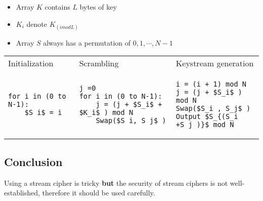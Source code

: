 \begin{itemize}
    \item Array $K$ contains $L$ bytes of key 
    \item $K_i$ denote $K_{(i mod L)}$
    \item Array $S$ always has a permutation of $0, 1, \cdots, N-1$
\end{itemize}
\begin{center}
\begin{tabular}{m{4cm}m{4cm}m{4cm}}
    Initialization & Scrambling & Keystream generation \\
    \begin{lstlisting}[mathescape]
for i in (0 to N-1):
    $S_i$ = i
    \end{lstlisting}
    &
    \begin{lstlisting}[mathescape]
j =0
for i in (0 to N-1):
    j = (j + $S_i$ + $K_i$ ) mod N
    Swap($S_i, S_j$ )
    \end{lstlisting}
    &
    \begin{lstlisting}[mathescape]
i = (i + 1) mod N
j = (j + $S_i$ ) mod N
Swap($S_i , S_j$ )
Output $S_{(S_i +S_j )}$ mod N
\end{lstlisting}
\end{tabular}
\end{center}


\subsection{Conclusion}
Using a stream cipher is tricky \textbf{but} the security of stream ciphers is not
well-established, therefore it should be used carefully.


